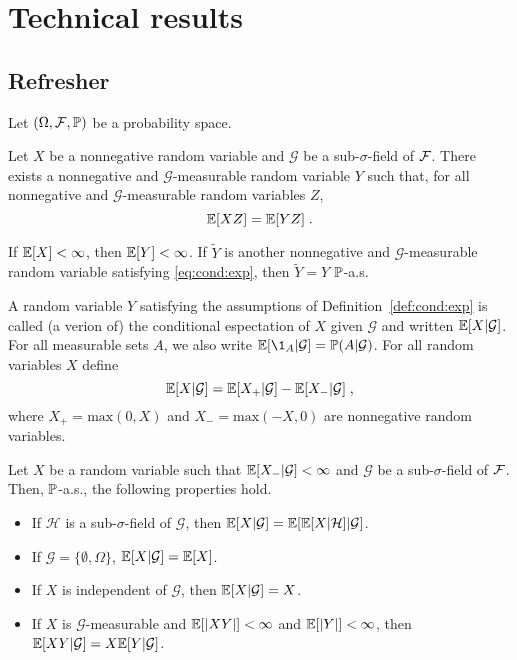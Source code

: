 \chapter{Technical results}
\minitoc

\section{Refresher}
Let $(\Omega, \mathcal{F}, \mathbb{P})$ be a probability space.
\begin{shaded}
\begin{definition}
\label{def:cond:exp}
Let $X$ be a nonnegative random variable and $\mathcal{G}$ be a sub-$\sigma$-field of $\mathcal{F}$. There exists a nonnegative and $\mathcal{G}$-measurable random variable $Y$ such that, for  all nonnegative and $\mathcal{G}$-measurable random variables $Z$,
\begin{equation}
\label{eq:cond:exp}
\mathbb{E}[XZ] = \mathbb{E}[YZ]\;.
\end{equation}
\end{definition}
\end{shaded}
\begin{remark}
If $\mathbb{E}[X]<\infty$, then $\mathbb{E}[Y]<\infty$. If $\widetilde Y$ is another nonnegative and $\mathcal{G}$-measurable random variable satisfying \eqref{eq:cond:exp}, then $\widetilde Y = Y$ $\mathbb{P}$-a.s.
\end{remark}
A random variable $Y$ satisfying the assumptions of Definition~\ref{def:cond:exp} is called (a verion of) the conditional espectation of $X$ given $\mathcal{G}$ and written $\mathbb{E}[X|\mathcal{G}]$. For all measurable sets $A$, we also write $\bE[\1_A|\mathcal{G}] = \bP(A|\mathcal{G})$. For all random variables $X$ define
$$
\mathbb{E}[X|\mathcal{G}] = \mathbb{E}[X_+|\mathcal{G}] - \mathbb{E}[X_-|\mathcal{G}]\;,
$$
where $X_+ = \mathrm{max}(0,X)$ and $X_- = \mathrm{max}(-X,0)$ are nonnegative random variables.

\begin{shaded}
\begin{proposition}
\label{prop:cond:exp}
Let $X$ be a random variable such that $\mathbb{E}[X_-|\mathcal{G}]<\infty$ and $\mathcal{G}$ be a sub-$\sigma$-field of $\mathcal{F}$. Then, $\mathbb{P}$-a.s., the following properties hold.
\begin{itemize}
\item  If $\mathcal{H}$ is a sub-$\sigma$-field of $\mathcal{G}$, then $\mathbb{E}[X|\mathcal{G}] = \mathbb{E}[\mathbb{E}[X|\mathcal{H}]|\mathcal{G}]$.
\item If $\mathcal{G} = \{\emptyset,\Omega\}$, $\mathbb{E}[X|\mathcal{G}]=\mathbb{E}[X]$.
\item If $X$ is independent of $\mathcal{G}$, then $\mathbb{E}[X|\mathcal{G}]=X$.
\item  If $X$ is $\mathcal{G}$-measurable and $\mathbb{E}[|XY|]<\infty$ and $\mathbb{E}[|Y|]<\infty$, then $\mathbb{E}[XY|\mathcal{G}] = X\mathbb{E}[Y|\mathcal{G}]$.
\end{itemize}
\end{proposition}
\end{shaded}




